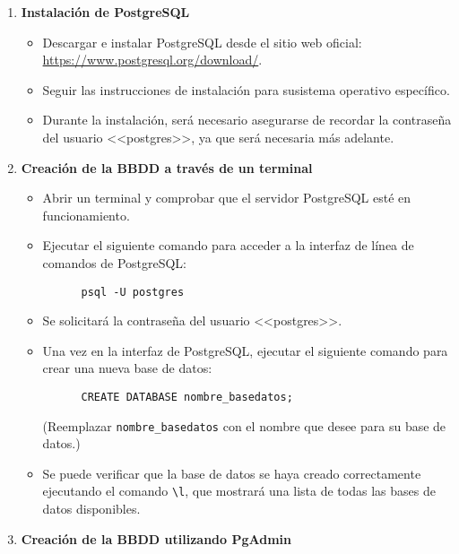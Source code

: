\begin{enumerate}
  \item \textbf{Instalación de PostgreSQL}

  \begin{itemize}
    \item Descargar e instalar PostgreSQL desde el sitio web oficial: \url{https://www.postgresql.org/download/}.
    \item Seguir las instrucciones de instalación para susistema operativo específico.
    \item Durante la instalación, será necesario asegurarse de recordar la contraseña del usuario <<postgres>>, ya que será necesaria más adelante.
  \end{itemize}

  \item \textbf{Creación de la BBDD a través de un terminal}

  \begin{itemize}
    \item Abrir un terminal y comprobar que el servidor PostgreSQL esté en funcionamiento.
    \item Ejecutar el siguiente comando para acceder a la interfaz de línea de comandos de PostgreSQL:
      \begin{verbatim}
      psql -U postgres
      \end{verbatim}
    \item Se solicitará la contraseña del usuario <<postgres>>.
    \item Una vez en la interfaz de PostgreSQL, ejecutar el siguiente comando para crear una nueva base de datos:
      \begin{verbatim}
      CREATE DATABASE nombre_basedatos;
      \end{verbatim}
      (Reemplazar \texttt{nombre\_basedatos} con el nombre que desee para su base de datos.)
    \item Se puede verificar que la base de datos se haya creado correctamente ejecutando el comando \texttt{\textbackslash l}, que mostrará una lista de todas las bases de datos disponibles.
  \end{itemize}

  \item \textbf{Creación de la BBDD utilizando PgAdmin}


\end{enumerate}
